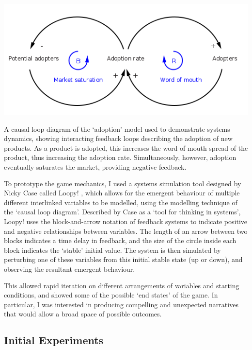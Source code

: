 \documentclass[nofonts,nols,justified,nobib]{tufte-book}
\begin{document}
\begin{marginfigure}
  \includegraphics[width=1\linewidth]{img/3/adoption.png}
\caption{A causal loop diagram of the `adoption' model used to demonstrate systems dynamics, showing interacting feedback loops describing the adoption of new products. As a product is adopted, this increases the word-of-mouth spread of the product, thus increasing the adoption rate. Simultaneously, however, adoption eventually saturates the market, providing negative feedback. \cite{blleininger_english_2010}}
\end{marginfigure}

To prototype the game mechanics, I used a systems simulation tool designed by Nicky Case called Loopy! \cite{case_loopy!_2017}, which allows for the emergent behaviour of multiple different interlinked variables to be modelled, using the modelling technique of the `causal loop diagram'. Described by Case as a `tool for thinking in systems', Loopy! uses the block-and-arrow notation of feedback systems to indicate positive and negative relationships between variables. The length of an arrow between two blocks indicates a time delay in feedback, and the size of the circle inside each block indicates the `stable' initial value. The system is then simulated by perturbing one of these variables from this initial stable state (up or down), and observing the resultant emergent behaviour. 

This allowed rapid iteration on different arrangements of variables and starting conditions, and showed some of the possible `end states' of the game. In particular, I was interested in producing compelling and unexpected narratives that would allow a broad space of possible outcomes.

\subsection*{Initial Experiments}
\end{document}
